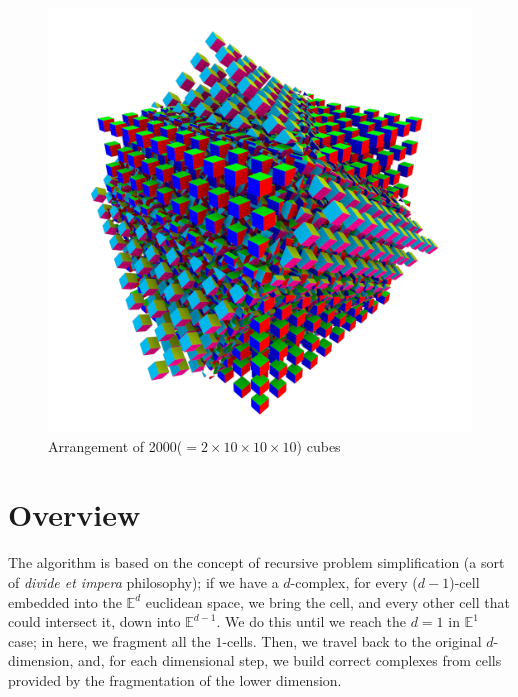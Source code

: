 \begin{figure}[H]
    \centering
    \includegraphics[width=\textwidth]{./img/cube10x10.pdf}
    \caption{Arrangement of 2000($=2\times10\times10\times10$) cubes}
\end{figure}





\section{Overview}
\label{sec:spatial_arrangement_overview}
The algorithm is based on the concept of recursive problem simplification 
(a sort of \textit{divide et impera} philosophy); if we have a $d$-complex, for every
($d-1$)-cell embedded into the $\mathbb{E}^d$ euclidean space, we bring the cell,
and every other cell that could intersect it, down into $\mathbb{E}^{d-1}$. We do this until
we reach the $d=1$ in $\mathbb{E}^1$ case; in here, we fragment all the $1$-cells.
Then, we travel back to the original $d$-dimension, and, for each
dimensional step, we build correct complexes from cells provided by the 
fragmentation of the lower dimension. 

